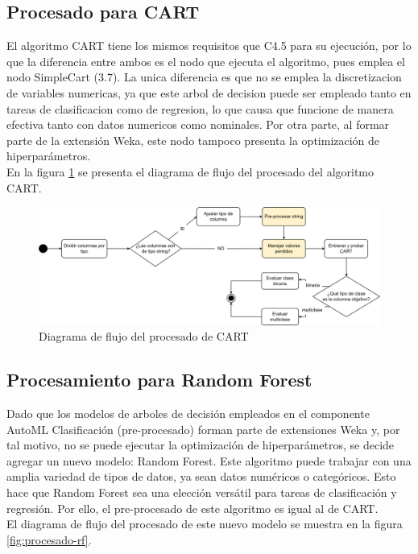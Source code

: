 \subsection{Procesado para CART}
El algoritmo CART tiene los mismos requisitos que C4.5 para su ejecución, por lo que la diferencia entre ambos es el nodo que ejecuta el algoritmo, pues emplea el nodo SimpleCart (3.7). La unica diferencia es que no se emplea la discretizacion de variables numericas, ya que este arbol de decision puede ser empleado tanto en tareas de clasificacion como de regresion, lo que causa que funcione de manera efectiva tanto con datos numericos como nominales. Por otra parte, al formar parte de la extensión Weka, este nodo tampoco presenta la optimización de hiperparámetros. \\
En la figura \ref{fig:procesado-cart} se presenta el diagrama de flujo del procesado del algoritmo CART.

\begin{figure}[H]
	\centering
	\includegraphics[width=1\linewidth]{"figuras/capi 2/modelos/procesado cart.drawio"}
	\caption{Diagrama de flujo del procesado de CART}
	\label{fig:procesado-cart}
\end{figure}


\subsection{Procesamiento para Random Forest}
Dado que los modelos de arboles de decisión empleados en el componente AutoML Clasificación (pre-procesado) forman parte de extensiones Weka y, por tal motivo, no se puede ejecutar la optimización de hiperparámetros, se decide agregar un nuevo modelo: Random Forest. Este algoritmo puede trabajar con una amplia variedad de tipos de datos, ya sean datos numéricos o categóricos. Esto hace que Random Forest sea una elección versátil para tareas de clasificación y regresión. Por ello, el pre-procesado de este algoritmo es igual al de CART. \\
El diagrama de flujo del procesado de este nuevo modelo se muestra en la figura \ref{fig:procesado-rf}.

